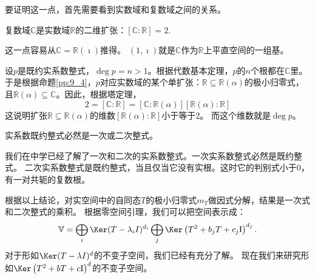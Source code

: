 \documentclass[12pt,UTF8]{ctexbook}
\begin{document}
要证明这一点，首先需要看到实数域和复数域之间的关系。
\begin{pp}\label{pp:9_9}
    复数域$\mathbb{C}$是实数域$\mathbb{R}$的二维扩张：$[\mathbb{C} : \mathbb{R}] = 2$.
\end{pp}
这一点容易从$\mathbb{C} = \mathbb{R}(\imath )$推得。
$(1, \imath )$就是$\mathbb{C}$作为$\mathbb{R}$上平直空间的一组基。

设$p$是既约实系数整式，$\deg p = n > 1$。根据代数基本定理，$p$的$n$个根都在$\mathbb{C}$里。
于是根据命题\ref{pp:9_4}，$p$对应实数域的某个单扩张：$\mathbb{R}\subseteq\mathbb{R}(\alpha)$的极小归零式，
且$\mathbb{R}(\alpha)\subseteq\mathbb{C}$。因此，根据塔定理，
$$ 2 = [\mathbb{C} : \mathbb{R}] = [\mathbb{C} : \mathbb{R}(\alpha)] [\mathbb{R}(\alpha) : \mathbb{R}]$$
这说明扩张$\mathbb{R}\subseteq\mathbb{R}(\alpha)$的维数$[\mathbb{R}(\alpha) : \mathbb{R}]$小于等于2。
而这个维数就是$\deg p$。
\begin{pp}\label{pp:9_10}
    实系数既约整式必然是一次或二次整式。
\end{pp}
我们在中学已经了解了一次和二次的实系数整式。一次实系数整式必然是既约整式。
二次实系数整式是既约整式，当且仅当它没有实根。这时它的判别式小于0，有一对共轭的复数根。

根据以上结论，对实空间中的自同态$T$的极小归零式$m_T$做因式分解，结果是一次式和二次整式的乘积。
根据零空间引理，我们可以把空间表示成：
$$ \mathbb{V} = \bigoplus_{i}\Ker (T - \lambda_i I)^{d_i} \bigoplus_{j} \Ker \left(T^2 + b_jT + c_j\mathrm{I}\right)^{d_j} . $$
对于形如$\Ker (T - \lambda I)^{d}$的不变子空间，我们已经有充分了解。
现在我们来研究形如$\Ker \left(T^2 + b T + c\mathrm{I}\right)^{d}$的不变子空间。
\end{document}
